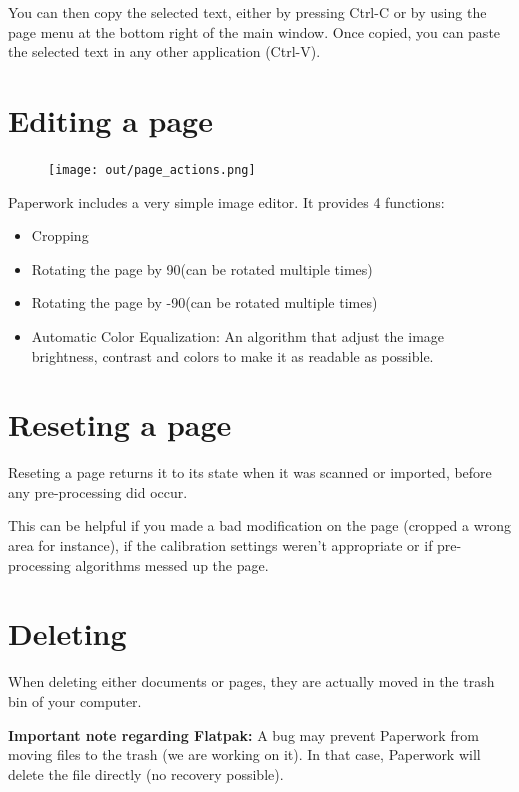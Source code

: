 \documentclass[10pt,a4paper]{article}
\begin{document}
You can then copy the selected text, either by pressing Ctrl-C or by using
the page menu at the bottom right of the main window. Once copied, you can
paste the selected text in any other application (Ctrl-V).

\section{Editing a page}

\begin{figure}[H]
	\texttt{[image: out/page\_actions.png]}
\end{figure}

Paperwork includes a very simple image editor. It provides 4 functions:

\begin{itemize}
	\item Cropping
	\item Rotating the page by 90\degree (can be rotated multiple times)
	\item Rotating the page by -90\degree (can be rotated multiple times)
	\item Automatic Color Equalization: An algorithm that adjust the image
		brightness, contrast and colors to make it as readable as
		possible.
\end{itemize}

\section{Reseting a page}

Reseting a page returns it to its state when it was scanned or imported,
before any pre-processing did occur.

This can be helpful if you made a bad modification on the page (cropped a wrong
area for instance), if the calibration settings weren't appropriate or if
pre-processing algorithms messed up the page.


\section{Deleting}

When deleting either documents or pages, they are actually moved in the trash
bin of your computer.

\textbf{Important note regarding Flatpak:} A bug may prevent Paperwork from
moving files to the trash (we are working on it). In that case, Paperwork will
delete the file directly (no recovery possible).
\end{document}
